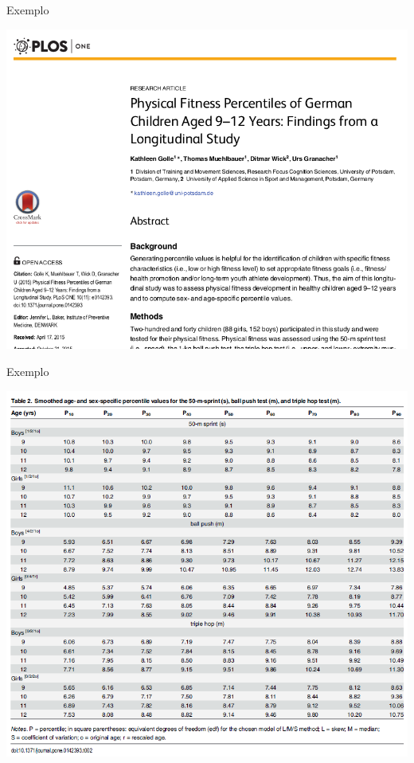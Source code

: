 \documentclass{beamer}
\begin{document}
\begin{frame}{\scriptsize Exemplo}
  \begin{center}
    \includegraphics[height=\textheight]{Cap3/percentil0}
  \end{center}
\end{frame}

\begin{frame}{\scriptsize Exemplo}
  \begin{center}
    \includegraphics[height=\textheight]{Cap3/percentil1}
  \end{center}
\end{frame}
\end{document}
